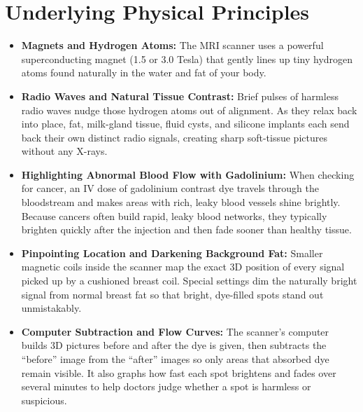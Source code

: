 \section{Underlying Physical Principles}
\begin{itemize}
\item \textbf{Magnets and Hydrogen Atoms:} The MRI scanner uses a powerful superconducting magnet (1.5 or 3.0 Tesla) that gently lines up tiny hydrogen atoms found naturally in the water and fat of your body.
\item \textbf{Radio Waves and Natural Tissue Contrast:} Brief pulses of harmless radio waves nudge those hydrogen atoms out of alignment. As they relax back into place, fat, milk-gland tissue, fluid cysts, and silicone implants each send back their own distinct radio signals, creating sharp soft-tissue pictures without any X-rays.
\item \textbf{Highlighting Abnormal Blood Flow with Gadolinium:} When checking for cancer, an IV dose of gadolinium contrast dye travels through the bloodstream and makes areas with rich, leaky blood vessels shine brightly. Because cancers often build rapid, leaky blood networks, they typically brighten quickly after the injection and then fade sooner than healthy tissue.
\item \textbf{Pinpointing Location and Darkening Background Fat:} Smaller magnetic coils inside the scanner map the exact 3D position of every signal picked up by a cushioned breast coil. Special settings dim the naturally bright signal from normal breast fat so that bright, dye-filled spots stand out unmistakably.
\item \textbf{Computer Subtraction and Flow Curves:} The scanner's computer builds 3D pictures before and after the dye is given, then subtracts the ``before'' image from the ``after'' images so only areas that absorbed dye remain visible. It also graphs how fast each spot brightens and fades over several minutes to help doctors judge whether a spot is harmless or suspicious.
\end{itemize}

